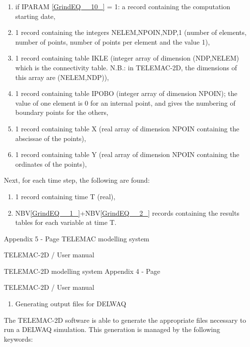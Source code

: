 \documentclass{article} %
\begin{document}
\begin{enumerate}
\item  if IPARAM \eqref{GrindEQ__10_} = 1: a record containing the computation starting date,

\item  1 record containing the integers NELEM,NPOIN,NDP,1 (number of elements, number of points, number of points per element and the value 1),

\item  1 record containing table IKLE (integer array of dimension (NDP,NELEM) which is the connectivity table. N.B.: in TELEMAC-2D, the dimensions of this array are (NELEM,NDP)),

\item  1 record containing table IPOBO (integer array of dimension NPOIN); the value of one element is 0 for an internal point, and gives the numbering of boundary points for the others,

\item  1 record containing table X (real array of dimension NPOIN containing the abscissae of the points),

\item  1 record containing table Y (real array of dimension NPOIN containing the ordinates of the points),
\end{enumerate}

 Next, for each time step, the following are found:

\begin{enumerate}
\item  1 record containing time T (real),

\item  NBV\eqref{GrindEQ__1_}+NBV\eqref{GrindEQ__2_} records containing the results tables for each variable at time T.
\end{enumerate}

 Appendix 5 - Page   TELEMAC modelling system

 TELEMAC-2D / User manual



 TELEMAC-2D modelling system Appendix 4 - Page

 TELEMAC-2D / User manual



\begin{enumerate}
\item   Generating output files for DELWAQ
\end{enumerate}



 The TELEMAC-2D software is able to generate the appropriate files necessary to run a DELWAQ simulation. This generation is managed by the following keywords:
\end{document}
